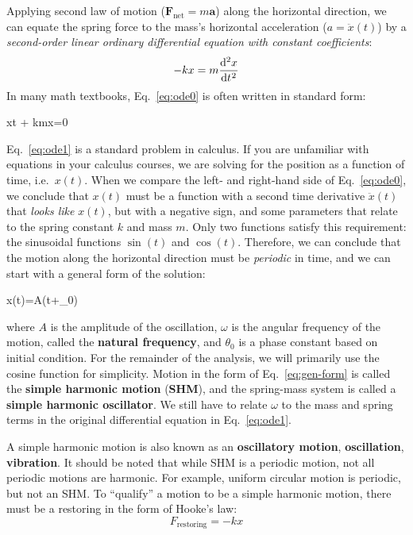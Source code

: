 Applying second law of motion ($\bm F_\text{net}=m\bm a$) along the horizontal
direction, we can equate the spring force to the mass's horizontal acceleration
($a=\ddot x(t)$) by a \emph{second-order linear ordinary differential equation
with constant coefficients}:
\begin{equation}
  -kx =m\diff[2]xt
  \label{eq:ode0}
\end{equation}
In many math textbooks, Eq.~\ref{eq:ode0} is often written in standard form:
\begin{important-equation}
  \diff[2]xt + \frac kmx=0
  \label{eq:ode1}
\end{important-equation}
Eq.~\ref{eq:ode1} is a standard problem in calculus. If you are unfamiliar with
equations in your calculus courses, we are solving for the position as a
function of time, i.e.\ $x(t)$. When we compare the left- and right-hand side
of Eq.~\ref{eq:ode0}, we conclude that $x(t)$ must be a function with a second
time derivative $\ddot x(t)$ that \emph{looks like} $x(t)$, but with a negative
sign, and some parameters that relate to the spring constant $k$ and mass $m$.
Only two functions satisfy this requirement: the sinusoidal functions
$\sin(t)$ and $\cos(t)$. Therefore, we can conclude that the motion along the
horizontal direction must be \emph{periodic} in time, and we can start with a
general form of the solution:
\begin{important-equation}
  \quad x(t)=A\cos(\omega t+\theta_0)
  \label{eq:gen-form}
\end{important-equation}
where $A$ is the amplitude of the oscillation, $\omega$ is the angular
frequency of the motion, called the \textbf{natural frequency}, and $\theta_0$
is a phase constant based on initial condition. For the remainder of the
analysis, we will primarily use the cosine function for simplicity. Motion in
the form of Eq.~\ref{eq:gen-form} is called the \textbf{simple harmonic motion}
(\textbf{SHM}), and the spring-mass system is called a
\textbf{simple harmonic oscillator}. We still have to relate $\omega$ to the
mass and spring terms in the original differential equation in
Eq.~\ref{eq:ode1}.
\begin{remark}
  A simple harmonic motion is also known as an \textbf{oscillatory motion},
  \textbf{oscillation}, \textbf{vibration}.
  It should be noted that while SHM is a periodic motion, not all periodic
  motions are harmonic. For example, uniform circular motion is periodic, but
  not an SHM.  To ``qualify'' a motion to be a simple harmonic motion, there
  must be a restoring in the form of Hooke's law:
  \begin{equation*}
    F_\text{restoring}=-kx
  \end{equation*}
\end{remark}
